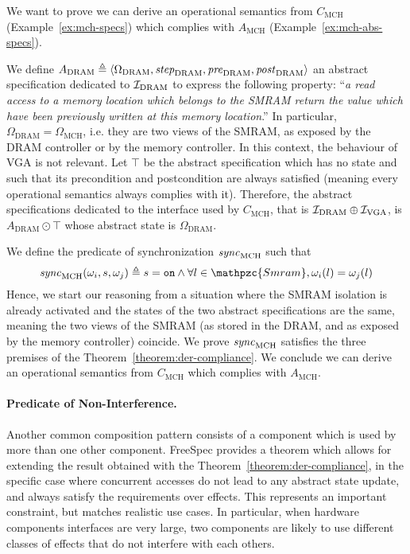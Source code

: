 \begin{example}
  We want to prove we can derive an operational semantics from
  $C_{\mathrm{MCH}}$ (Example~\ref{ex:mch-specs}) which complies with
  $A_{\mathrm{MCH}}$ (Example~\ref{ex:mch-abs-specs}).

  We define
  $A_{\mathrm{DRAM}} \triangleq \langle \Omega_{\mathrm{DRAM}},
  \mathit{step}_{\mathrm{DRAM}}, \mathit{pre}_{\mathrm{DRAM}},
  \mathit{post}_{\mathrm{DRAM}} \rangle$ an abstract specification dedicated to
  $\mathcal{I}_{\mathrm{DRAM}}$ to express the following property: ``\emph{a read access
    to a memory location which belongs to the SMRAM return the value which have
    been previously written at this memory location}.'' In particular,
  $\Omega_{\mathrm{DRAM}} = \Omega_{\mathrm{MCH}}$, i.e. they are two views of
  the SMRAM, as exposed by the DRAM controller or by the memory controller.
  In this context, the behaviour of VGA is not relevant. Let $\top$ be the
  abstract specification which has no state and such that its precondition and
  postcondition are always satisfied (meaning every operational semantics always
  complies with it).
  Therefore, the abstract specifications dedicated to the interface used by
  $C_{\mathrm{MCH}}$, that is $\mathcal{I}_{\mathrm{DRAM}} \oplus \mathcal{I}_{\mathrm{VGA}}$, is
  $A_{\mathrm{DRAM}} \odot \top$ whose abstract state is
  $\Omega_{\mathrm{DRAM}}$.

  We define the predicate of synchronization $\mathit{sync}_{\mathrm{MCH}}$ such
  that
  \[ \func{sync}_{\mathrm{MCH}}(\omega_i, s, \omega_j) \triangleq s = \val{on}
    \wedge \forall l \in \mathpzc{Smram}, \omega_i(l) = \omega_j(l)
  \] Hence, we start our reasoning from a situation where the SMRAM isolation is
  already activated and the states of the two abstract specifications are the
  same, meaning the two views of the SMRAM (as stored in the DRAM, and as
  exposed by the memory controller) coincide.
  We prove $\mathit{sync}_{\mathrm{MCH}}$ satisfies the three premises of the
  Theorem~\ref{theorem:der-compliance}. We conclude we can derive an operational
  semantics from $C_{\mathrm{MCH}}$ which complies with $A_{\mathrm{MCH}}$.
\end{example}

\paragraph{Predicate of Non-Interference.}
%
Another common composition pattern consists of a component which is used by more
than one other component.
%
FreeSpec provides a theorem which allows for extending the result obtained with
the Theorem~\ref{theorem:der-compliance}, in the specific case where concurrent
accesses do not lead to any abstract state update, and always satisfy the
requirements over effects.
%
This represents an important constraint, but matches realistic use cases.
%
In particular, when hardware components interfaces are very large, two
components are likely to use different classes of effects that do not interfere
with each others.


